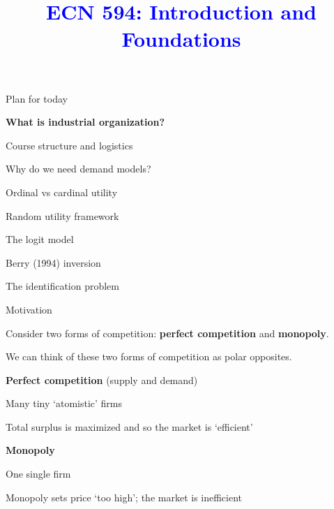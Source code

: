 \documentclass[notes,11pt, aspectratio=169]{beamer}
\title[]{\textcolor{blue}{ECN 594: Introduction and Foundations}}
\author[PGP]{}
\institute[FRBNY]{\small{\begin{tabular}{c c c}
Nicholas Vreugdenhil \\
\end{tabular}}}
\date{}
\newenvironment{wideitemize}{\itemize\addtolength{\itemsep}{10pt}}{\enditemize}
\newenvironment{wideenumerate}{\enumerate\addtolength{\itemsep}{10pt}}{\endenumerate}
\begin{document}
\begin{frame}
\maketitle
  \centering
\end{frame}

\begin{frame}{Plan for today}
  \begin{wideenumerate}
    \item \textbf{What is industrial organization?}
    \item Course structure and logistics
    \item Why do we need demand models?
    \item Ordinal vs cardinal utility
    \item Random utility framework
    \item The logit model
    \item Berry (1994) inversion
    \item The identification problem
  \end{wideenumerate}
\end{frame}


\begin{frame}{Motivation}
	\begin{wideitemize}
		\item Consider two forms of competition: \textbf{perfect competition} and \textbf{monopoly}.
		\item We can think of these two forms of competition as polar opposites.
		\item \textbf{Perfect competition} (supply and demand)
		\begin{wideitemize}
			\vspace{5pt}
			\item Many tiny `atomistic' firms
			\item Total surplus is maximized and so the market is `efficient'
		\end{wideitemize}
			\item \textbf{Monopoly}
		\begin{wideitemize}
			\vspace{5pt}
			\item One single firm
			\item Monopoly sets price `too high'; the market is inefficient
		\end{wideitemize}
	\end{wideitemize}
\end{frame}
\end{document}
